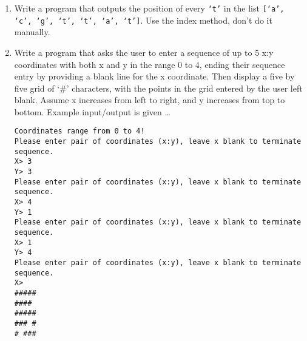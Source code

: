 \begin{enumerate}
	\item Write a program that outputs the position of every \texttt{`t'} in the    list \texttt{[`a', `c', `g', `t', `t', `a', `t']}. Use the index method,    don't do it manually.
	\item Write a program that asks the user to enter a sequence of up to    5 x:y coordinates with both x and y in the range 0 to 4, ending    their sequence entry by providing a blank line for the x    coordinate. Then display a five by five grid of `\#' characters,    with the points in the grid entered by the user left blank. Assume    x increases from left to right, and y increases from top to bottom.    Example input/output is given \ldots          
\begin{lstlisting}
Coordinates range from 0 to 4!
Please enter pair of coordinates (x:y), leave x blank to terminate sequence.
X> 3
Y> 3
Please enter pair of coordinates (x:y), leave x blank to terminate sequence.
X> 4
Y> 1
Please enter pair of coordinates (x:y), leave x blank to terminate sequence.
X> 1
Y> 4
Please enter pair of coordinates (x:y), leave x blank to terminate sequence.
X>
#####
#### 
#####
### #
# ###
\end{lstlisting}
\end{enumerate}
